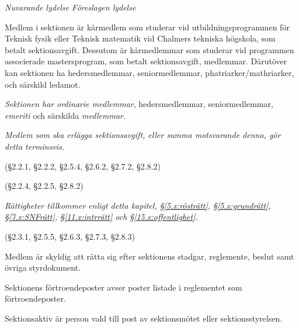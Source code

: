 \documentclass{article}
\newenvironment{lydelse}
    {\begin{paracol}{2}%
        \emph{Nuvarande lydelse}%
        \switchcolumn%
        \emph{Föreslagen lydelse}%
    \end{paracol}%
    \begin{enumerate}[label=\thesubsection.\arabic*]%
    \begin{paracol}{2}%
    }{\end{paracol}\end{enumerate}}
\begin{document}
\begin{lydelse}
    \item Medlem i sektionen är kårmedlem som studerar vid utbildningsprogrammen för Teknisk fysik eller Teknisk matematik vid Chalmers tekniska högskola, som betalt sektionsavgift. Dessutom är kårmedlemmar som studerar vid programmen associerade mastersprogram, som betalt sektionsavgift, medlemmar. Därutöver kan sektionen ha hedersmedlemmar, seniormedlemmar, phatri\-arker/\-mathri\-arker, och särskild ledamot.
    
  \switchcolumn
  \setcounter{enumi}{0}
    \item \emph{Sektionen har ordinarie medlemmar}, hedersmedlemmar, seniormedlemmar, \emph{emeriti} och särskilda \emph{medlemmar}.
    
  \switchcolumn*
  \switchcolumn
    \item \emph{Medlem som ska erlägga sektionsavgift, eller summa motsvarande denna, gör detta terminsvis.}


  \switchcolumn*
    \item[] (\S 2.2.1, \S 2.2.2, \S 2.5.4, \S 2.6.2, \S 2.7.2, \S 2.8.2)
    \item[] (\S 2.2.4, \S 2.2.5, \S 2.8.2)
  \switchcolumn
    \item \emph{Rättigheter tillkommer enligt detta kapitel, \S\ref{5.x:rösträtt}, \S\ref{5.x:grundrätt}, \S\ref{7.x:SNFrätt}, \S\ref{11.x:intrrätt} och \S\ref{15.x:offentlighet}.} \label{2.x:allarätt} 
    
  \switchcolumn*
    (\S 2.3.1, \S 2.5.5, \S 2.6.3, \S 2.7.3, \S 2.8.3)

  \switchcolumn
    \item Medlem är skyldig att rätta sig efter sektionens stadgar, regle\-mente, beslut samt övriga styrdokument.
      \label{2.1:skyldig}
    
  \switchcolumn*
  \setcounter{subsection}{4}
  \setcounter{enumi}{0}
    \item Sektionens förtroendeposter avser poster listade i reglementet som förtroendeposter.
    
    \item Sektionsaktiv är person vald till post av sektionsmötet eller sektionsstyrelsen.
    

\end{lydelse}
\end{document}
